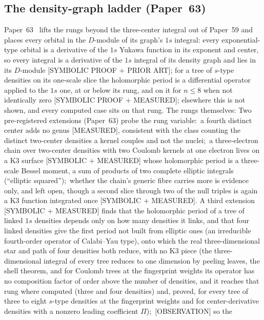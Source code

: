 \documentclass[aps,pra,twocolumn,superscriptaddress,longbibliography]{revtex4-2}
\newcommand{\gvc}[2]{#2}
\begin{document}
\subsection{The density-graph ladder (Paper~63)}
Paper~63~\cite{loutey_paper63} lifts the rungs beyond the three-center integral out of Paper~59 and places every orbital in the $D$-module of its graph's $1s$ integral: \gvc{p63-dictionary-module}{every exponential-type orbital is a derivative of the $1s$ Yukawa function in its exponent and center, so every integral is a derivative of the $1s$ integral of its density graph and lies in its $D$-module [SYMBOLIC PROOF + PRIOR ART]; for a tree of $s$-type densities on its one-scale slice the holomorphic period is a differential operator applied to the $1s$ one, at or below its rung, and on it for $n\le8$ when not identically zero [SYMBOLIC PROOF + MEASURED]; elsewhere this is not shown, and every computed case sits on that rung}. The rungs themselves: Two pre-registered
extensions (Paper~63) probe the rung variable:\ \gvc{p59-four-centre-genus-one}{a
fourth distinct center adds no genus [MEASURED]}, consistent with the
class counting the distinct two-center densities a kernel couples and
not the nuclei;\ \gvc{p59-three-electron-k3}{a three-electron chain over two-center densities with two
Coulomb kernels at one electron lives on a K3 surface [SYMBOLIC +
MEASURED] whose holomorphic period is a three-scale Bessel moment, a sum
of products of two complete elliptic integrals (``elliptic squared'');\ whether the chain's generic fibre carries more
is evidence only, and left open}, though a second slice through two of the
null triples is again a K3 function integrated once [SYMBOLIC + MEASURED].  A third extension [SYMBOLIC +
MEASURED] finds that the holomorphic period of a tree of linked $1s$
densities depends only on how many densities it links, and that four linked
densities give the first period not built from elliptic ones (an
irreducible fourth-order operator of Calabi--Yau type), onto which the
real three-dimensional star and path of four densities both reduce, with
no K3 piece (the three-dimensional integral of every tree reduces to one
dimension by peeling leaves, the shell theorem, and for Coulomb trees at
the fingerprint weights its operator has no composition factor of order above
the number of densities, and it reaches that rung where computed (three
and four densities) and, proved, for every tree of three to eight $s$-type densities at the fingerprint weights and for
center-derivative densities with a nonzero leading coefficient $\Pi$);\ [OBSERVATION] so the
\end{document}
